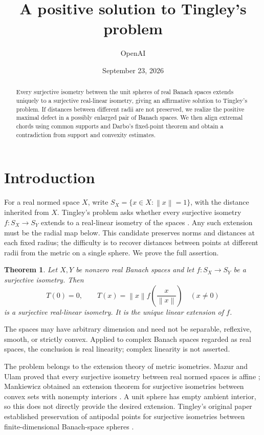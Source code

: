 \documentclass[11pt]{article}
\title{A positive solution to Tingley's problem}
\author{OpenAI}
\date{September 23, 2026}
\newtheorem{theorem}{Theorem}[section]
\theoremstyle{remark}
\newcommand{\norm}[1]{\left\lVert#1\right\rVert}
\begin{document}
\maketitle
\begin{abstract}
Every surjective isometry between the unit spheres of real Banach spaces extends uniquely to a surjective real-linear isometry, giving an affirmative solution to Tingley's problem. If distances between different radii are not preserved, we realize the positive maximal defect in a possibly enlarged pair of Banach spaces. We then align extremal chords using common supports and Darbo's fixed-point theorem and obtain a contradiction from support and convexity estimates.
\end{abstract}

\section{Introduction}\label{sec:intro}

For a real normed space $X$, write $S_X=\{x\in X:\norm{x}=1\}$, with the distance inherited from $X$. Tingley's problem asks whether every surjective isometry $f:S_X\to S_Y$ extends to a real-linear isometry of the spaces \cite{Tingley1987}. Any such extension must be the radial map below. This candidate preserves norms and distances at each fixed radius; the difficulty is to recover distances between points at different radii from the metric on a single sphere. We prove the full assertion.

\begin{theorem}\label{thm:main}
Let $X,Y$ be nonzero real Banach spaces and let $f:S_X\to S_Y$ be a surjective isometry. Then
\[
T(0)=0,\qquad T(x)=\norm{x}f\left(\frac{x}{\norm{x}}\right)\quad(x\ne0)
\]
is a surjective real-linear isometry. It is the unique linear extension of $f$.
\end{theorem}

The spaces may have arbitrary dimension and need not be separable, reflexive, smooth, or strictly convex. Applied to complex Banach spaces regarded as real spaces, the conclusion is real linearity; complex linearity is not asserted.

The problem belongs to the extension theory of metric isometries.
Mazur and Ulam proved that every surjective isometry between real normed
spaces is affine \cite{MazurUlam1932}; Mankiewicz obtained an extension
theorem for surjective isometries between convex sets with nonempty interiors
\cite{Mankiewicz1972}. A unit sphere has empty ambient interior, so this
does not directly provide the desired extension. Tingley's original
paper established preservation of antipodal points for surjective
isometries between finite-dimensional Banach-space spheres
\cite{Tingley1987}.
\end{document}
